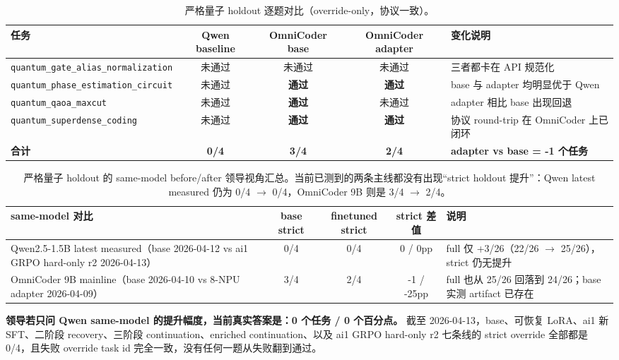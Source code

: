 \documentclass[11pt,a4paper]{article}
\newcommand{\code}[1]{\begingroup\ttfamily\footnotesize\nolinkurl{#1}\endgroup}
\begin{document}
\begin{table}[htbp]
\centering
\small
\begin{tabularx}{\textwidth}{p{3.2cm} c c c Y}
\toprule
任务 & Qwen baseline & OmniCoder base & OmniCoder adapter & 变化说明 \\
\midrule
\code{quantum\_gate\_alias\_normalization} & 未通过 & 未通过 & 未通过 & 三者都卡在 API 规范化 \\
\code{quantum\_phase\_estimation\_circuit} & 未通过 & \textcolor{green!50!black}{\textbf{通过}} & \textcolor{green!50!black}{\textbf{通过}} & base 与 adapter 均明显优于 Qwen \\
\code{quantum\_qaoa\_maxcut} & 未通过 & \textcolor{green!50!black}{\textbf{通过}} & 未通过 & adapter 相比 base 出现回退 \\
\code{quantum\_superdense\_coding} & 未通过 & \textcolor{green!50!black}{\textbf{通过}} & \textcolor{green!50!black}{\textbf{通过}} & 协议 round-trip 在 OmniCoder 上已闭环 \\
\midrule
\textbf{合计} & \textbf{0/4} & \textbf{3/4} & \textbf{2/4} & \textbf{adapter vs base = -1 个任务} \\
\bottomrule
\end{tabularx}
\caption{严格量子 holdout 逐题对比（override-only，协议一致）。}
\label{tab:strict-task-by-task}
\end{table}

\begin{table}[htbp]
\centering
\small
\begin{tabularx}{\textwidth}{p{4.2cm} c c c Y}
\toprule
same-model 对比 & base strict & finetuned strict & strict 差值 & 说明 \\
\midrule
Qwen2.5-1.5B latest measured（base 2026-04-12 vs ai1 GRPO hard-only r2 2026-04-13） & 0/4 & 0/4 & 0 / 0pp & full 仅 +3/26（22/26 $\rightarrow$ 25/26），strict 仍无提升 \\
OmniCoder 9B mainline（base 2026-04-10 vs 8-NPU adapter 2026-04-09） & 3/4 & 2/4 & -1 / -25pp & full 也从 25/26 回落到 24/26；base 实测 artifact 已存在 \\
\bottomrule
\end{tabularx}
\caption{严格量子 holdout 的 same-model before/after 领导视角汇总。当前已测到的两条主线都没有出现“strict holdout 提升”：Qwen latest measured 仍为 0/4 $\rightarrow$ 0/4，OmniCoder 9B 则是 3/4 $\rightarrow$ 2/4。}
\label{tab:strict-override-compare}
\end{table}

\noindent\textbf{领导若只问 Qwen same-model 的提升幅度，当前真实答案是：0 个任务 / 0 个百分点。}
截至 2026-04-13，base、可恢复 LoRA、ai1 新 SFT、二阶段 recovery、三阶段 continuation、enriched continuation、以及 ai1 GRPO hard-only r2 七条线的 strict override 全部都是 0/4，且失败 override task id 完全一致，没有任何一题从失败翻到通过。
\end{document}
